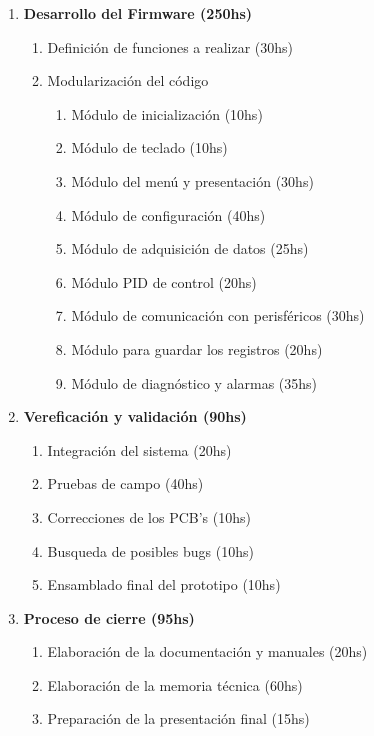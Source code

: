 \documentclass[11pt]{charter}
\begin{document}
\begin{enumerate}
	\item \textbf{Desarrollo del Firmware (250hs)}
	\begin{enumerate}[label*=\arabic*.]
		\item Definición de funciones a realizar (30hs)
		\item Modularización del código
			\begin{enumerate}[label*=\arabic*.]
				\item Módulo de inicialización (10hs)
				\item Módulo de teclado (10hs)
				\item Módulo del menú y presentación (30hs)
				\item Módulo de configuración (40hs)
				\item Módulo de adquisición de datos (25hs)
				\item Módulo PID de control (20hs)	
				\item Módulo de comunicación con perisféricos (30hs)
				\item Módulo para guardar los registros  (20hs)
				\item Módulo de diagnóstico y alarmas (35hs)   
			\end{enumerate}	  
	\end{enumerate}
	
	\item \textbf{Vereficación y validación (90hs)}
	\begin{enumerate}[label*=\arabic*.]
		\item Integración del sistema (20hs)
		\item Pruebas de campo (40hs)
		\item Correcciones de los PCB's (10hs)	
		\item Busqueda de posibles bugs  (10hs)
		\item Ensamblado final del prototipo (10hs)  
	\end{enumerate}	
	
	\item \textbf{Proceso de cierre (95hs)}
	\begin{enumerate}[label*=\arabic*.]
		\item Elaboración de la documentación y manuales (20hs)
		\item Elaboración de la memoria técnica (60hs)
		\item Preparación de la presentación final (15hs)	 
	\end{enumerate}		
\end{enumerate}
\end{document}
